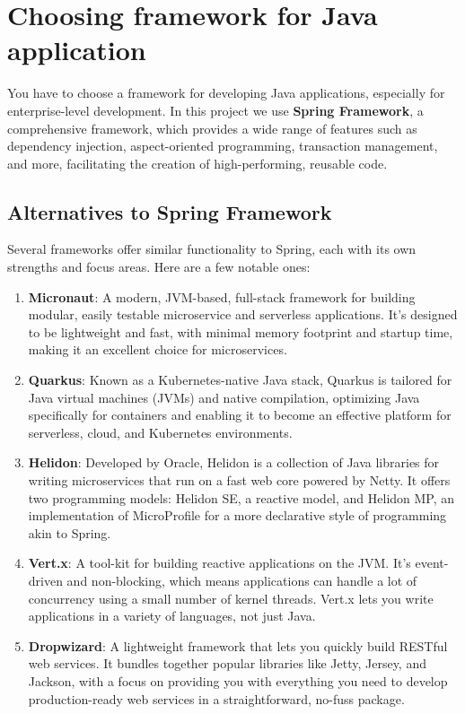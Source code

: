 \documentclass[a4paper,12pt]{article}
\begin{document}
\section{Choosing framework for Java application}
You have to choose a framework for developing Java applications,
especially for enterprise-level development.
In this project we use \textbf{Spring Framework},
a comprehensive framework, which provides a wide range of features such as dependency injection,
aspect-oriented programming, transaction management, and more,
facilitating the creation of high-performing, reusable code.

\subsection{Alternatives to Spring Framework}
Several frameworks offer similar functionality to Spring, each with its own strengths and focus areas.
Here are a few notable ones:
\begin{enumerate}
    \item \textbf{Micronaut}: A modern, JVM-based, full-stack framework for building modular,
    easily testable microservice and serverless applications.
    It's designed to be lightweight and fast, with minimal memory footprint and startup time, making it an excellent choice for microservices.
    \item \textbf{Quarkus}: Known as a Kubernetes-native Java stack,
    Quarkus is tailored for Java virtual machines (JVMs) and native compilation,
    optimizing Java specifically for containers and enabling it to become an effective platform
    for serverless, cloud, and Kubernetes environments.
    \item \textbf{Helidon}: Developed by Oracle, Helidon is a collection of Java libraries
    for writing microservices that run on a fast web core powered by Netty.
    It offers two programming models: Helidon SE, a reactive model, and Helidon MP,
    an implementation of MicroProfile for a more declarative style of programming akin to Spring.
    \item \textbf{Vert.x}: A tool-kit for building reactive applications on the JVM.
    It's event-driven and non-blocking, which means applications can handle
    a lot of concurrency using a small number of kernel threads.
    Vert.x lets you write applications in a variety of languages, not just Java.
    \item \textbf{Dropwizard}: A lightweight framework that lets you quickly build RESTful
    web services. It bundles together popular libraries like Jetty, Jersey, and Jackson,
    with a focus on providing you with everything you need to develop production-ready
    web services in a straightforward, no-fuss package.
\end{enumerate}
\end{document}
